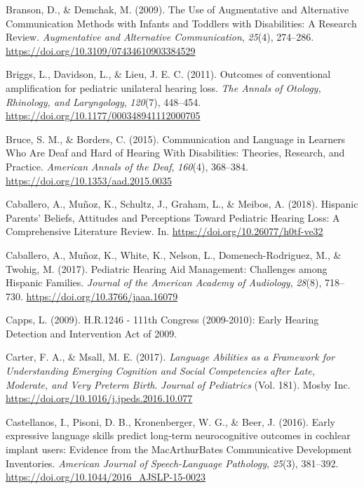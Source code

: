 \documentclass[
  english,
  man]{apa6}
\begin{document}
\leavevmode\hypertarget{ref-branson2009}{}%
Branson, D., \& Demchak, M. (2009). The Use of Augmentative and Alternative Communication Methods with Infants and Toddlers with Disabilities: A Research Review. \emph{Augmentative and Alternative Communication}, \emph{25}(4), 274--286. \url{https://doi.org/10.3109/07434610903384529}

\leavevmode\hypertarget{ref-briggs2011}{}%
Briggs, L., Davidson, L., \& Lieu, J. E. C. (2011). Outcomes of conventional amplification for pediatric unilateral hearing loss. \emph{The Annals of Otology, Rhinology, and Laryngology}, \emph{120}(7), 448--454. \url{https://doi.org/10.1177/000348941112000705}

\leavevmode\hypertarget{ref-bruce2015}{}%
Bruce, S. M., \& Borders, C. (2015). Communication and Language in Learners Who Are Deaf and Hard of Hearing With Disabilities: Theories, Research, and Practice. \emph{American Annals of the Deaf}, \emph{160}(4), 368--384. \url{https://doi.org/10.1353/aad.2015.0035}

\leavevmode\hypertarget{ref-caballero2018}{}%
Caballero, A., Muñoz, K., Schultz, J., Graham, L., \& Meibos, A. (2018). Hispanic Parents' Beliefs, Attitudes and Perceptions Toward Pediatric Hearing Loss: A Comprehensive Literature Review. In. \url{https://doi.org/10.26077/h0tf-ve32}

\leavevmode\hypertarget{ref-caballero2017}{}%
Caballero, A., Muñoz, K., White, K., Nelson, L., Domenech-Rodriguez, M., \& Twohig, M. (2017). Pediatric Hearing Aid Management: Challenges among Hispanic Families. \emph{Journal of the American Academy of Audiology}, \emph{28}(8), 718--730. \url{https://doi.org/10.3766/jaaa.16079}

\leavevmode\hypertarget{ref-capps2009}{}%
Capps, L. (2009). H.R.1246 - 111th Congress (2009-2010): Early Hearing Detection and Intervention Act of 2009.

\leavevmode\hypertarget{ref-carter2017}{}%
Carter, F. A., \& Msall, M. E. (2017). \emph{Language Abilities as a Framework for Understanding Emerging Cognition and Social Competencies after Late, Moderate, and Very Preterm Birth}. \emph{Journal of Pediatrics} (Vol. 181). Mosby Inc. \url{https://doi.org/10.1016/j.jpeds.2016.10.077}

\leavevmode\hypertarget{ref-castellanos2016}{}%
Castellanos, I., Pisoni, D. B., Kronenberger, W. G., \& Beer, J. (2016). Early expressive language skills predict long-term neurocognitive outcomes in cochlear implant users: Evidence from the MacArthurBates Communicative Development Inventories. \emph{American Journal of Speech-Language Pathology}, \emph{25}(3), 381--392. \url{https://doi.org/10.1044/2016_AJSLP-15-0023}
\end{document}
